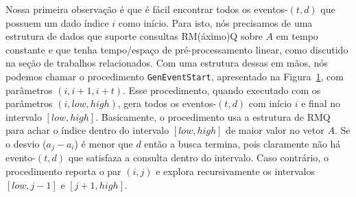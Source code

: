 \documentclass[12pt]{article}
\begin{document}
Nossa primeira observação é que é fácil encontrar todos os eventos-$(t,d)$ que possuem
um dado índice $i$ como início. Para isto, nós precisamos de uma estrutura de dados que
suporte consultas RM(áximo)Q sobre $A$ em tempo constante e que tenha tempo/espaço de pré-processamento linear,
como discutido na seção de trabalhos relacionados. Com uma estrutura dessas em mãos, nós podemos
chamar o procedimento {\tt GenEventStart}, apresentado na Figura~\ref{geneventstart}, com parâmetros
$(i, i + 1, i + t)$. Esse procedimento, quando executado com os parâmetros $(i, low, high)$, gera
todos os eventos-$(t,d)$ com início $i$ e final no intervalo $[low, high]$. Basicamente, o procedimento
usa a estrutura de RMQ para achar o índice dentro do intervalo $[low, high]$ de maior valor no 
vetor $A$. Se o desvio ($a_j - a_i$) é menor que $d$ então a busca termina, pois claramente não
há evento-$(t,d)$ que satisfaza a consulta dentro do intervalo. Caso contrário, o procedimento reporta
o par $(i, j)$ e explora recursivamente os intervalos $[low, j - 1]$ e $[j + 1, high]$.
 
\begin{figure}
\label{geneventstart}
\end{figure}
\end{document}
